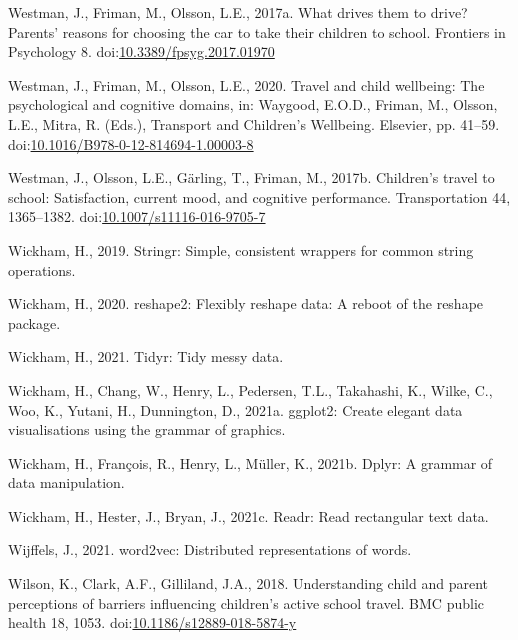 \documentclass[]{elsarticle} %
\newlength{\cslhangindent}
\newlength{\cslentryspacingunit} %
\newenvironment{CSLReferences}[2] %
 {%
  \setlength{\parindent}{0pt}
  \ifodd #1
  \let\oldpar\par
  \def\par{\hangindent=\cslhangindent\oldpar}
  \fi
  \setlength{\parskip}{#2\cslentryspacingunit}
 }%
 {}
\begin{document}
\begin{CSLReferences}{1}{0}
\leavevmode{}%
Westman, J., Friman, M., Olsson, L.E., 2017a. What drives them to drive?
\textemdash Parents' reasons for choosing the car to take their children
to school. Frontiers in Psychology 8.
doi:\href{https://doi.org/10.3389/fpsyg.2017.01970}{10.3389/fpsyg.2017.01970}

\leavevmode{}%
Westman, J., Friman, M., Olsson, L.E., 2020. Travel and child wellbeing:
The psychological and cognitive domains, in: Waygood, E.O.D., Friman,
M., Olsson, L.E., Mitra, R. (Eds.), Transport and Children's Wellbeing.
{Elsevier}, pp. 41--59.
doi:\href{https://doi.org/10.1016/B978-0-12-814694-1.00003-8}{10.1016/B978-0-12-814694-1.00003-8}

\leavevmode{}%
Westman, J., Olsson, L.E., Gärling, T., Friman, M., 2017b. Children's
travel to school: Satisfaction, current mood, and cognitive performance.
Transportation 44, 1365--1382.
doi:\href{https://doi.org/10.1007/s11116-016-9705-7}{10.1007/s11116-016-9705-7}

\leavevmode{}%
Wickham, H., 2019. Stringr: Simple, consistent wrappers for common
string operations.

\leavevmode{}%
Wickham, H., 2020. reshape2: Flexibly reshape data: A reboot of the
reshape package.

\leavevmode{}%
Wickham, H., 2021. Tidyr: Tidy messy data.

\leavevmode{}%
Wickham, H., Chang, W., Henry, L., Pedersen, T.L., Takahashi, K., Wilke,
C., Woo, K., Yutani, H., Dunnington, D., 2021a. ggplot2: Create elegant
data visualisations using the grammar of graphics.

\leavevmode{}%
Wickham, H., François, R., Henry, L., Müller, K., 2021b. Dplyr: A
grammar of data manipulation.

\leavevmode{}%
Wickham, H., Hester, J., Bryan, J., 2021c. Readr: Read rectangular text
data.

\leavevmode{}%
Wijffels, J., 2021. word2vec: Distributed representations of words.

\leavevmode{}%
Wilson, K., Clark, A.F., Gilliland, J.A., 2018. Understanding child and
parent perceptions of barriers influencing children's active school
travel. BMC public health 18, 1053.
doi:\href{https://doi.org/10.1186/s12889-018-5874-y}{10.1186/s12889-018-5874-y}


\end{CSLReferences}
\end{document}
